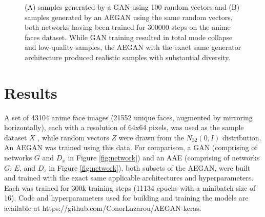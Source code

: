 \documentclass{article}
\begin{document}
\begin{figure}[t]%
    \centering
    \qquad
    \caption{(A) samples generated by a GAN using 100 random vectors and (B) samples generated by an AEGAN using the same random vectors, both networks having been trained for 300000 steps on the anime faces dataset. While GAN training resulted in total mode collapse and low-quality samples, the AEGAN with the exact same generator architecture produced realistic samples with substantial diversity.}%
    \label{fig:generated}%
\end{figure}

\section{Results}


A set of 43104 anime face images (21552 unique faces, augmented by mirroring horizontally), each with a resolution of 64x64 pixels, was used as the sample dataset $X$ \cite{rakshit_2019}, while random vectors $Z$ were drawn from the $N_{32}(0, I)$ distribution. An AEGAN was trained using this data. For comparison, a GAN (comprising of networks $G$ and $D_x$ in Figure \ref{fig:network}) and an AAE (comprising of networks $G$, $E$, and $D_z$ in Figure \ref{fig:network}), both subsets of the AEGAN, were built and trained with the exact same applicable architectures and hyperparameters. Each was trained for 300k training steps (11134 epochs with a minibatch size of 16). Code and hyperparameters used for building and training the models are available at https://github.com/ConorLazarou/AEGAN-keras.
\end{document}
